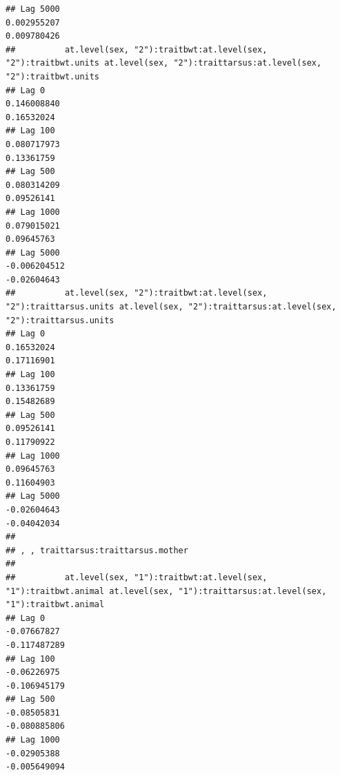 \documentclass[
  12pt,
]{book}
\begin{document}
\begin{verbatim}
## Lag 5000                                                      0.002955207                                                         0.009780426
##          at.level(sex, "2"):traitbwt:at.level(sex, "2"):traitbwt.units at.level(sex, "2"):traittarsus:at.level(sex, "2"):traitbwt.units
## Lag 0                                                      0.146008840                                                       0.16532024
## Lag 100                                                    0.080717973                                                       0.13361759
## Lag 500                                                    0.080314209                                                       0.09526141
## Lag 1000                                                   0.079015021                                                       0.09645763
## Lag 5000                                                  -0.006204512                                                      -0.02604643
##          at.level(sex, "2"):traitbwt:at.level(sex, "2"):traittarsus.units at.level(sex, "2"):traittarsus:at.level(sex, "2"):traittarsus.units
## Lag 0                                                          0.16532024                                                          0.17116901
## Lag 100                                                        0.13361759                                                          0.15482689
## Lag 500                                                        0.09526141                                                          0.11790922
## Lag 1000                                                       0.09645763                                                          0.11604903
## Lag 5000                                                      -0.02604643                                                         -0.04042034
## 
## , , traittarsus:traittarsus.mother
## 
##          at.level(sex, "1"):traitbwt:at.level(sex, "1"):traitbwt.animal at.level(sex, "1"):traittarsus:at.level(sex, "1"):traitbwt.animal
## Lag 0                                                       -0.07667827                                                      -0.117487289
## Lag 100                                                     -0.06226975                                                      -0.106945179
## Lag 500                                                     -0.08505831                                                      -0.080885806
## Lag 1000                                                    -0.02905388                                                      -0.005649094

\end{verbatim}
\end{document}
